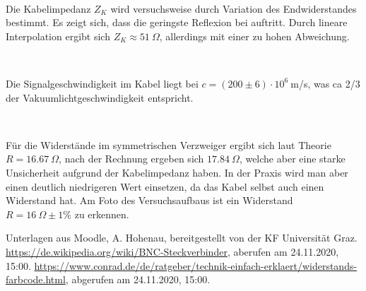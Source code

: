 \documentclass{article}
\begin{document}
~

Die Kabelimpedanz $Z_K$ wird versuchsweise durch Variation des Endwiderstandes bestimmt. Es zeigt sich, dass die geringste Reflexion bei  auftritt. Durch lineare Interpolation ergibt sich $Z_K \approx 51~\Omega$, allerdings mit einer zu hohen Abweichung.

~

Die Signalgeschwindigkeit im Kabel liegt bei $c = (200 \pm 6)\cdot 10^6~$m/s, was ca 2/3 der Vakuumlichtgeschwindigkeit entspricht.

~

Für die Widerstände im symmetrischen Verzweiger ergibt sich laut Theorie $R=16.67~\Omega$, nach der Rechnung ergeben sich $17.84~\Omega$, welche aber eine starke Unsicherheit aufgrund der Kabelimpedanz haben. In der Praxis wird man aber einen deutlich niedrigeren Wert einsetzen, da das Kabel selbst auch einen Widerstand hat. Am Foto des Versuchsaufbaus ist ein Widerstand $R=16~\Omega \pm 1\%$ zu erkennen.





%

%


%


\begin{thebibliography}{9}
 Unterlagen aus Moodle, A. Hohenau, bereitgestellt von der KF Universität Graz.
 \url{https://de.wikipedia.org/wiki/BNC-Steckverbinder}, aberufen am 24.11.2020, 15:00.
 \url{https://www.conrad.de/de/ratgeber/technik-einfach-erklaert/widerstands-farbcode.html}, abgerufen am 24.11.2020, 15:00.
\end{thebibliography}
\end{document}
